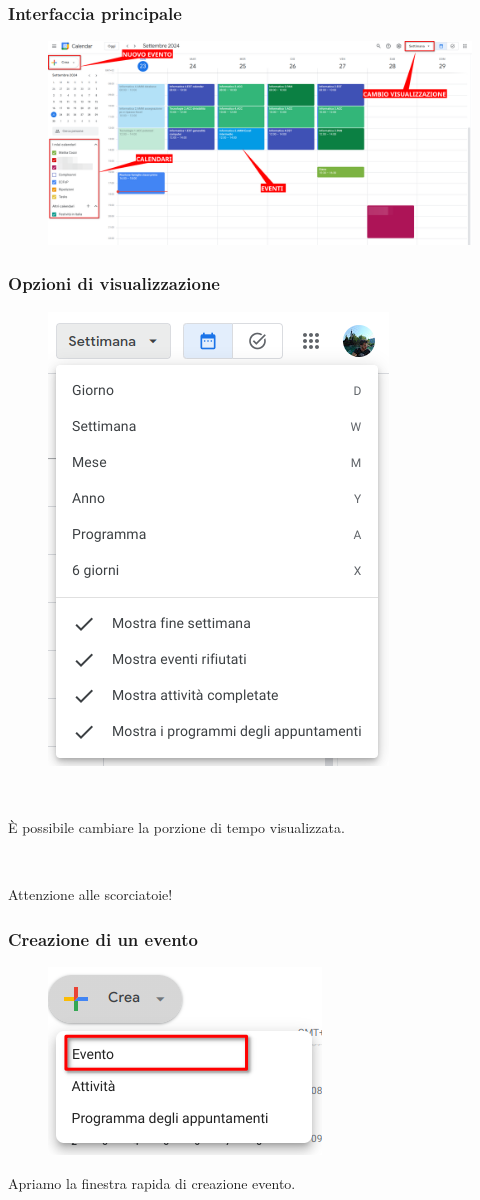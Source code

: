 \documentclass[handout]{beamer}
\begin{document}
\begin{frame}
\frametitle{Interfaccia principale}
\begin{figure}
  \includegraphics[width=\columnwidth]{img/calendar1.png}
\end{figure}
\end{frame}

\begin{frame}
\frametitle{Opzioni di visualizzazione}
\begin{figure}
  \includegraphics[width=.35\columnwidth]{img/calendarvisua.png}
\end{figure}

~

È possibile cambiare la porzione di tempo visualizzata.\pause

~

Attenzione alle scorciatoie!
\end{frame}


\begin{frame}
\frametitle{Creazione di un evento}
\begin{figure}
  \includegraphics[width=.3\columnwidth]{img/calendarcrea.png}
\end{figure}
Apriamo la \alert{finestra rapida} di creazione evento.
\end{frame}
\end{document}
